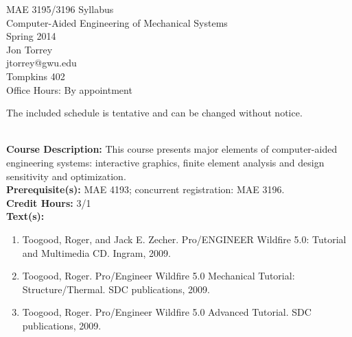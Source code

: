 \documentclass[11pt]{article}
\begin{document}
\LARGE MAE 3195/3196 Syllabus\\
\LARGE Computer-Aided Engineering of Mechanical Systems \\
\LARGE Spring 2014 \\

\large Jon Torrey \\
\large jtorrey@gwu.edu \\
\large Tompkins 402 \\
\large Office Hours: By appointment \\
\begin{center} The included schedule is tentative and can be changed without notice. \\
\end{center}

\textbf {\large \\ Course Description:} This course presents major elements of computer-aided engineering systems: interactive graphics, finite element analysis and design sensitivity and optimization. \\

\textbf{Prerequisite(s):} MAE 4193; concurrent registration: MAE 3196.\\

\textbf{Credit Hours:} 3/1 \\

\textbf{\large Text(s):}
\begin{enumerate}
    \item Toogood, Roger, and Jack E. Zecher. Pro/ENGINEER Wildfire 5.0: Tutorial and Multimedia CD. Ingram, 2009.
    \item Toogood, Roger. Pro/Engineer Wildfire 5.0 Mechanical Tutorial: Structure/Thermal. SDC publications, 2009.
    \item Toogood, Roger. Pro/Engineer Wildfire 5.0 Advanced Tutorial. SDC publications, 2009.
\end{enumerate}
\end{document}
